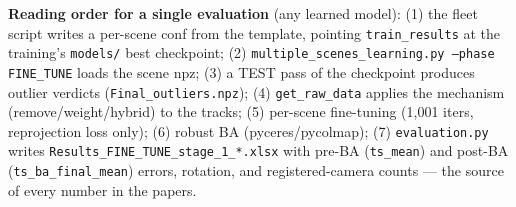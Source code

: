 \documentclass[10pt]{article}
\newcommand{\code}[1]{\texttt{\small #1}}
\begin{document}
\noindent\textbf{Reading order for a single evaluation} (any learned model): (1) the fleet
script writes a per-scene conf from the template, pointing \code{train\_results} at the
training's \code{models/} best checkpoint; (2) \code{multiple\_scenes\_learning.py
--phase FINE\_TUNE} loads the scene npz; (3) a TEST pass of the checkpoint produces
outlier verdicts (\code{Final\_outliers.npz}); (4) \code{get\_raw\_data} applies the
mechanism (remove/weight/hybrid) to the tracks; (5) per-scene fine-tuning (1{,}001
iters, reprojection loss only); (6) robust BA (pyceres/pycolmap); (7)
\code{evaluation.py} writes \code{Results\_FINE\_TUNE\_stage\_1\_*.xlsx} with pre-BA
(\code{ts\_mean}) and post-BA (\code{ts\_ba\_final\_mean}) errors, rotation, and
registered-camera counts --- the source of every number in the papers.
\end{document}
